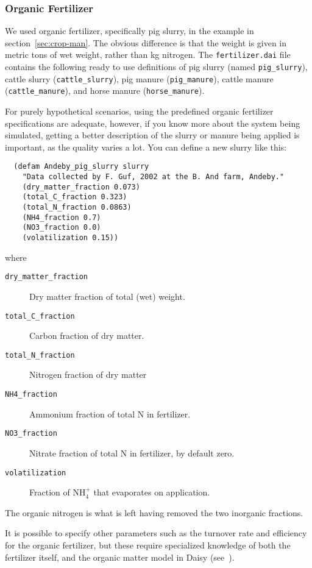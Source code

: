 \documentclass[a4paper]{article}
\begin{document}
\subsubsection{Organic Fertilizer}

We used organic fertilizer, specifically pig slurry, in the example in
section~\ref{sec:crop-man}.  The obvious difference is that the weight
is given in metric tons of wet weight, rather than kg nitrogen.  The
\texttt{fertilizer.dai} file contains the following ready to use
definitions of pig slurry (named \texttt{pig\_slurry}), cattle slurry
(\texttt{cattle\_slurry}), pig manure (\texttt{pig\_manure}), cattle
manure (\texttt{cattle\_manure}), and horse manure
(\texttt{horse\_manure}).

For purely hypothetical scenarios, using the predefined organic
fertilizer specifications are adequate, however, if you know more
about the system being simulated, getting a better description of the
slurry or manure being applied is important, as the quality varies a
lot.  You can define a new slurry like this:
\begin{verbatim}
  (defam Andeby_pig_slurry slurry
    "Data collected by F. Guf, 2002 at the B. And farm, Andeby."
    (dry_matter_fraction 0.073)
    (total_C_fraction 0.323)
    (total_N_fraction 0.0863)
    (NH4_fraction 0.7)
    (NO3_fraction 0.0)
    (volatilization 0.15))
\end{verbatim}
where
\begin{description}
\item[\texttt{dry\_matter\_fraction}] Dry matter fraction of total
  (wet) weight.
\item[\texttt{total\_C\_fraction}] Carbon fraction of dry matter.
\item[\texttt{total\_N\_fraction}] Nitrogen fraction of dry matter
\item[\texttt{NH4\_fraction}] Ammonium fraction of total N in
  fertilizer.
\item[\texttt{NO3\_fraction}] Nitrate fraction of total N in
  fertilizer, by default zero.
\item[\texttt{volatilization}] Fraction of NH$_4^+$ that evaporates on
  application.
\end{description}
The organic nitrogen is what is left having removed the two inorganic
fractions.

It is possible to specify other parameters such as the turnover rate
and efficiency for the organic fertilizer, but these require
specialized knowledge of both the fertilizer itself, and the organic
matter model in Daisy (see~\cite{daisy-new}).
\end{document}
